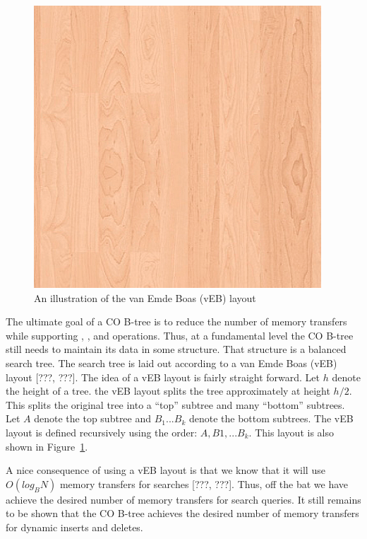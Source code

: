 \documentclass{style}
\begin{document}
\begin{figure}

\begin{center}
	\includegraphics[width=0.8\columnwidth]{figures/veb.png}
\end{center}

\caption{An illustration of the van Emde Boas (vEB) layout}
\label{fig:veb}
\end{figure}


The ultimate goal of a CO B-tree is to reduce the number of memory transfers
while supporting \Search{}, \Insert{}, and \Delete{} operations. Thus, at a
fundamental level the CO B-tree still needs to maintain its data in some
structure. That structure is a balanced search tree. The search tree is laid
out according to a van Emde Boas (vEB) layout [???, ???]. The idea of a vEB
layout is fairly straight forward. Let $h$ denote the height of a tree. the
vEB layout splits the tree approximately at height $h/2$. This splits the
original tree into a ``top'' subtree and many ``bottom'' subtrees. Let $A$
denote the top subtree and $B_1... B_k$ denote the bottom subtrees. The vEB
layout is defined recursively using the order: $A, B1, ... B_k$. This layout
is also shown in Figure~\ref{fig:veb}.

A nice consequence of using a vEB layout is that we know that it will use
$O(log_B N)$ memory transfers for searches [???, ???]. Thus, off the bat we
have achieve the desired number of memory transfers for search queries. It
still remains to be shown that the CO B-tree achieves the desired number of
memory transfers for dynamic inserts and deletes.
\end{document}
